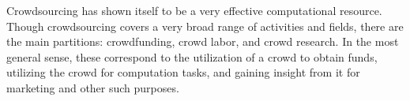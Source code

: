 Crowdsourcing has shown itself to be a very effective computational resource. Though crowdsourcing covers a very broad range of activities and fields, there are the main partitions: crowdfunding, crowd labor, and crowd research. In the most general sense, these correspond to the utilization of a crowd to obtain funds, utilizing the crowd for computation tasks, and gaining insight from it for marketing and other such purposes.




